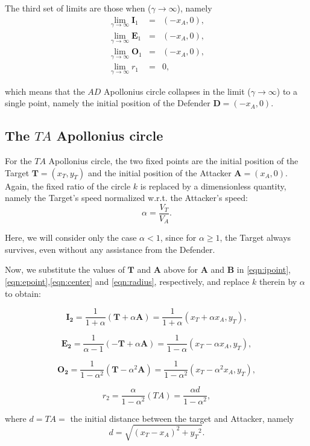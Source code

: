 The third set of limits are those when ($\gamma\to\infty$), namely
\begin{eqnarray}
\lim_{\gamma\to\infty} \boldsymbol{I}_1 &=& (-x_A,0), \\
\lim_{\gamma\to\infty} \boldsymbol{E}_1 &=& (-x_A,0),\\
\lim_{\gamma\to\infty} \boldsymbol{O}_1 &=& (-x_A,0),\\
\lim_{\gamma\to\infty} r_1 &=& 0,
\end{eqnarray}

which means that the $AD$ Apollonius circle collapses in the limit ($\gamma\to\infty$) to a single point, namely the initial position of the Defender $\boldsymbol{D}=(-x_A,0)$.

\subsection{The $TA$ Apollonius circle}
For the $TA$ Apollonius circle, the two fixed points are the initial position of the Target $\boldsymbol{T}=(x_{T},y_{T})$ and the initial position of the Attacker  $\boldsymbol{A}=(x_{A},0)$.
Again, the fixed ratio of the circle $k$ is replaced by a dimensionless quantity, namely the Target's speed normalized w.r.t. the Attacker's speed: 
\begin{equation}
\alpha= \dfrac{V_{T}}{V_{A}}.
\end{equation}

Here, we will consider only the case $\alpha <1$, since for $\alpha\geqslant1$, the Target always survives, even without any assistance from the Defender.

Now, we substitute the values of $\boldsymbol{T}$ and $\boldsymbol{A}$ above for $\boldsymbol{A}$ and $\boldsymbol{B}$ in \eqref{eqn:ipoint},\eqref{eqn:epoint},\eqref{eqn:center} and \eqref{eqn:radius}, respectively, and replace $k$ therein by $\alpha$ to obtain:

\begin{equation}
\boldsymbol{I_{2}} =\dfrac{1}{1+\alpha}(\boldsymbol{T}+\alpha \boldsymbol{A}) =\dfrac{1}{1+\alpha}(x_{T}+\alpha x_{A},y_{T}),
\end{equation}

\begin{equation}
\boldsymbol{E_{2}} =\dfrac{1}{\alpha-1}(-\boldsymbol{T}+\alpha \boldsymbol{A}) =\dfrac{1}{1-\alpha}(x_{T}-\alpha x_{A},y_{T}),
\end{equation}

\begin{equation}
\boldsymbol{O_{2}} =\dfrac{1}{1-\alpha^{2}}(\boldsymbol{T}-\alpha^{2} \boldsymbol{A}) =\dfrac{1}{1-\alpha^{2}}(x_{T}-\alpha^{2} x_{A},y_{T}),
\label{O2}
\end{equation}

\begin{equation}
r_{2} =\dfrac{\alpha}{1-\alpha^{2}}(TA)
= \dfrac{\alpha d}{1-\alpha^{2}},
\label{r2}
\end{equation}

where $d=TA=$ the initial distance between the target and Attacker, namely
\begin{equation}
d=\sqrt{(x_{T}-x_{A})^{2}+{y_{T}}^{2}}.
\label{d}
\end{equation}
